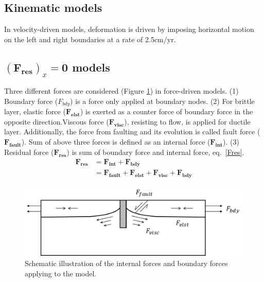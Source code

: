 \documentclass[letterpaper,12pt,notitle]{memphisthesis}                     %
\begin{document}
\subsection{Kinematic models}

In velocity-driven models, deformation is driven by imposing horizontal motion on the left and right boundaries at a rate of 2.5cm/yr. 

\subsection{$(\boldsymbol{F_{res}})_x \mathbf{=0}$ models}

Three different forces are considered (Figure \ref{fig:forcescheme}) in force-driven models. (1) Boundary force ($F_{bdy}$) is a force only applied at boundary nodes. (2) For brittle layer, elastic force ($\boldsymbol{F_{elst}}$) is exerted as a counter force of boundary force in the opposite direction.Viscous force ($\boldsymbol{F_{visc}}$), resisting to flow, is applied for ductile layer. Additionally, the force from faulting and its evolution is called fault force ($\boldsymbol{F_{fault}}$). Sum of above three forces is defined as an internal force ($\boldsymbol{F_{int}}$). (3) Residual force ($\boldsymbol{F_{res}}$) is sum of boundary force and internal force, eq.~\eqref{Fres}.
%
\begin{align} \label{Fres}
\mathbf{F_{res}} & = \mathbf{F_{int}} + \mathbf{F_{bdy}} \\
 & = \mathbf{F_{fault}} + \mathbf{F_{elst}} + \mathbf{F_{visc}} + \mathbf{F_{bdy}}
\end{align}
%
\begin{figure}[!htb]
	\centering
	\includegraphics[width=0.9\linewidth]{./figs/force.pdf}
	\caption{ Schematic illustration of the internal forces and boundary forces applying to the model.}
	\label{fig:forcescheme}
\end{figure}
\end{document}
